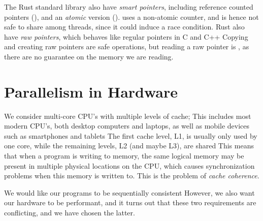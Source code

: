 \documentclass[b5paper]{report}
\begin{document}
The Rust standard library also have \emph{smart pointers}, including reference
counted pointers (), and an \emph{atomic} version
().  uses a non-atomic counter, and is hence not
safe to share among threads, since it could induce a race condition.
Rust also have \emph{raw pointers}, which behaves like regular pointers in C
and C++ Copying and creating raw pointers are safe operations, but reading a
raw pointer is , as there are no guarantee on the memory we are
reading.








\section{Parallelism in Hardware}
   We consider multi-core CPU's with multiple levels of cache;
This includes most modern CPU's, both desktop computers and laptops, as well as
mobile devices such as smartphones and tablets The first cache level, L1, is
usually only used by one core, while the remaining levels, L2 (and maybe L3),
are shared This means that when a program is writing to memory, the same
logical memory may be present in multiple physical locations on the CPU, which
causes synchronization problems when this memory is written to. This is the
problem of \emph{cache coherence}.

We would like our programs to be sequentially consistent However, we also
want our hardware to be performant, and it turns out that these two
requirements are conflicting, and we have chosen the latter.
\end{document}
